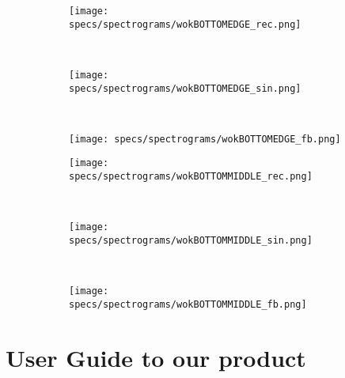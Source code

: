 \begin{figure}[H]
    \begin{subfigure}[b]{0.25\textwidth}
        \texttt{[image: specs/spectrograms/wokBOTTOMEDGE\_rec.png]}
    \end{subfigure}%
    ~ %
    \begin{subfigure}[b]{0.25\textwidth}
        \texttt{[image: specs/spectrograms/wokBOTTOMEDGE\_sin.png]}
    \end{subfigure}%
     ~ %
    \begin{subfigure}[b]{0.25\textwidth}
        \texttt{[image: specs/spectrograms/wokBOTTOMEDGE\_fb.png]}
    \end{subfigure}%
      
    \begin{subfigure}[b]{0.25\textwidth}
        \texttt{[image: specs/spectrograms/wokBOTTOMMIDDLE\_rec.png]}
    \end{subfigure}%
    ~ %
    \begin{subfigure}[b]{0.25\textwidth}
        \texttt{[image: specs/spectrograms/wokBOTTOMMIDDLE\_sin.png]}
    \end{subfigure}%
    ~ %
    \begin{subfigure}[b]{0.25\textwidth}
        \texttt{[image: specs/spectrograms/wokBOTTOMMIDDLE\_fb.png]}
    \end{subfigure}%
\end{figure}


\chapter{User Guide to our product}\label{ap:guide}

